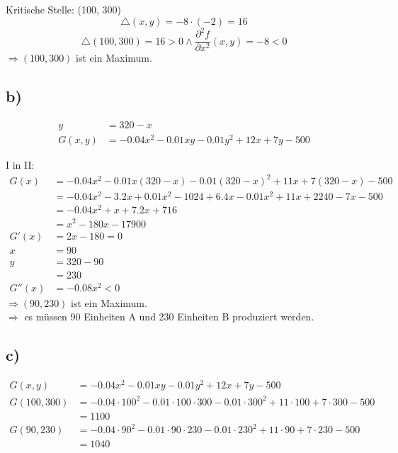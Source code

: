 \documentclass[a4paper]{scrartcl}
\begin{document}
Kritische Stelle: (100, 300) \\
\[ \triangle (x,y)= -8 \cdot (-2) = 16 \]
\[ \triangle (100,300) = 16 > 0 \land \frac {\partial^2 f} {\partial x^2}(x,y) = -8 < 0 \]
\( \Rightarrow (100, 300) \) ist ein Maximum. 


\newpage
\subsection{b)}
\begin{align}
y &= 320 -x \\
G(x,y) &= -0.04x^2 - 0.01 xy - 0.01y^2 + 12x + 7y - 500
\end{align}

I in II:
\begin{align}
G(x) &= -0.04x^2 - 0.01x(320-x)-0.01(320-x)^2 + 11x + 7(320-x) - 500 \\
&= -0.04x^2 - 3.2x + 0.01x^2 - 1024 + 6.4x - 0.01x^2 + 11x + 2240 - 7x - 500 \\\
&= -0.04x^2 + x + 7.2x + 716 \\
&= x^2 - 180x - 17900 \\
G'(x) &= 2x - 180 = 0 \\
x &= 90 \\
y &= 320 -90 \\
  &= 230 \\
G''(x) &= -0.08x^2 < 0\
\end{align}
\(\Rightarrow (90,230)\) ist ein Maximum.\\
\(\Rightarrow\) es müssen 90 Einheiten A und 230 Einheiten B produziert werden.

\subsection{c)}
\begin{align}
G(x,y) &= -0.04x^2 -0.01xy - 0.01y^2 +12x + 7y - 500 \\
G(100,300) &= -0.04 \cdot 100^2 - 0.01 \cdot 100 \cdot 300 - 0.01 \cdot 300^2 + 11 \cdot 100 + 7 \cdot 300 - 500 \\
&=  1100\\
G(90,230) &= -0.04 \cdot 90^2 - 0.01 \cdot 90 \cdot 230 - 0.01\cdot 230^2 + 11 \cdot 90 + 7 \cdot 230 - 500 \\
&= 1040
\end{align}
\end{document}
